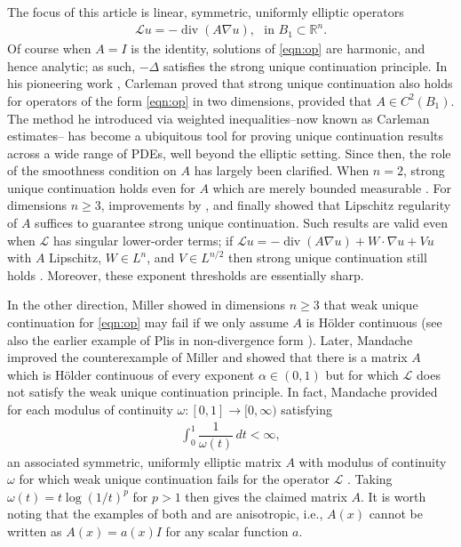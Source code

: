 \documentclass[12pt,leqno]{amsart}
\numberwithin{equation}{section}
\theoremstyle{definition}
\newcommand{\R}{\mathbb{R}}
\newcommand{\ra}{\rightarrow}
\DeclareMathOperator{\divv}{\mathrm{div}}
\begin{document}
The focus of this article is linear, symmetric, uniformly elliptic operators
\begin{align}\label{eqn:op}
	\mathcal{L} u  = -\divv(A \nabla  u )   , \, \, \text{ in } B_1 \subset \R^n.
\end{align}
Of course when $A = I$ is the identity, solutions of \eqref{eqn:op} are harmonic, and hence analytic; as such, $-\Delta$ satisfies the strong unique continuation principle. In his pioneering work \cite{Carleman-planar}, Carleman proved that strong unique continuation also holds for operators of the form \eqref{eqn:op} in two dimensions, provided that $A \in C^2(B_1)$. The method he introduced via weighted inequalities--now known as Carleman estimates-- has become a ubiquitous tool for proving unique continuation results across a wide range of PDEs, well beyond the elliptic setting. Since then, the role of the smoothness condition on $A$ has largely been clarified. When $n = 2$, strong unique continuation holds even for $A$ which are merely bounded measurable \cite{BN55,Schulz98}. For dimensions $n \ge 3$, improvements by \cite{Aronszajn,Agmon}, and finally \cite{GL86} showed that Lipschitz regularity of $A$ suffices to guarantee strong unique continuation. Such results are valid even when $\mathcal{L}$ has singular lower-order terms; if $\mathcal{L}u = - \divv(A \nabla u) + W \cdot \nabla u + V u$ with $A$ Lipschitz, $W \in L^{n}$, and $V \in L^{n/2}$ then strong unique continuation still holds \cite{JK85, Wolff92, KT01}. Moreover, these exponent thresholds are essentially sharp.

In the other direction, Miller showed in dimensions $n \ge 3$ \cite{Miller-ceg} that weak unique continuation for \eqref{eqn:op} may fail if we only assume $A$ is H\"{o}lder continuous (see also the earlier example of Plis in non-divergence form \cite{Plis-ceg}). Later, Mandache improved the counterexample of Miller and showed that there is a matrix $A$ which is H\"{o}lder continuous of every exponent $\alpha \in(0,1)$ but for which $\mathcal{L}$ does not satisfy the weak unique continuation principle. In fact, Mandache provided for each modulus of continuity $\omega:[0,1] \ra [0,\infty)$ satisfying
\begin{align}\label{eqn:non_osgood}
	\int_0^1 \dfrac{1}{\omega(t)} \, dt < \infty,
\end{align}
an associated symmetric, uniformly elliptic matrix $A$ with modulus of continuity $\omega$ for which weak unique continuation fails for the operator $\mathcal{L}$ \cite{Mandache-ceg}. Taking $\omega(t) = t \log(1/t)^p$ for $p > 1$ then gives the claimed matrix $A$. It is worth noting that the examples of both \cite{Miller-ceg} and \cite{Mandache-ceg} are anisotropic, i.e., $A(x)$ cannot be written as $A(x) = a(x)I$ for any scalar function $a$.  
\end{document}
